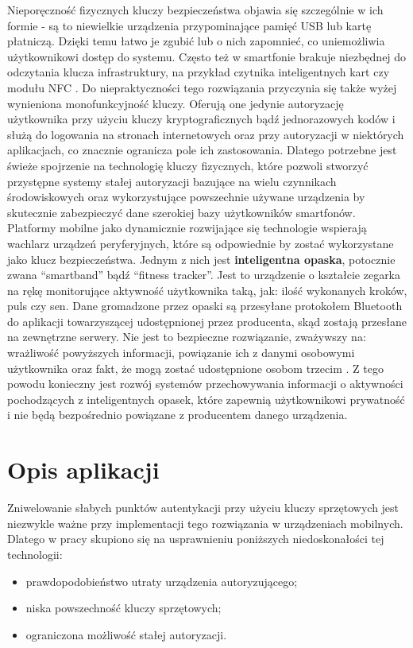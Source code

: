 \indent Nieporęczność fizycznych kluczy bezpieczeństwa objawia się szczególnie w ich formie - są to niewielkie urządzenia przypominające pamięć USB
lub kartę płatniczą. Dzięki temu łatwo je zgubić lub o nich zapomnieć, co uniemożliwia użytkownikowi dostęp do systemu. Często też w smartfonie
brakuje niezbędnej do odczytania klucza infrastruktury, na przykład czytnika inteligentnych kart czy modułu NFC \cite{Usability-Two-Factor}.
Do niepraktyczności tego rozwiązania przyczynia się także wyżej wynieniona monofunkcyjność kluczy. Oferują one jedynie autoryzację użytkownika przy
użyciu kluczy kryptograficznych bądź jednorazowych kodów i służą do logowania na stronach internetowych oraz przy autoryzacji w niektórych aplikacjach,
co znacznie ogranicza pole ich zastosowania. Dlatego potrzebne jest świeże spojrzenie na technologię kluczy fizycznych, które pozwoli stworzyć
przystępne systemy stałej autoryzacji bazujące na wielu czynnikach środowiskowych oraz wykorzystujące powszechnie używane urządzenia
by skutecznie zabezpieczyć dane szerokiej bazy użytkowników smartfonów.
\newline\newline
\indent Platformy mobilne jako dynamicznie rozwijające się technologie wspierają wachlarz urządzeń peryferyjnych, które są odpowiednie by zostać wykorzystane jako klucz bezpieczeństwa. Jednym z nich jest \textbf{inteligentna opaska}, potocznie zwana ``smartband'' bądź ``fitness tracker''. Jest to urządzenie o
kształcie zegarka na rękę monitorujące aktywność użytkownika taką, jak: ilość wykonanych kroków, puls czy sen. Dane gromadzone przez opaski są
przesyłane protokołem Bluetooth do aplikacji towarzyszącej udostępnionej przez producenta, skąd zostają przesłane na zewnętrzne serwery. Nie
jest to bezpieczne rozwiązanie, zważywszy na: wrażliwość powyższych informacji, powiązanie ich z danymi osobowymi użytkownika oraz fakt,
że mogą zostać udostępnione osobom trzecim \cite{Fitness-Tracker-Security}. Z tego powodu konieczny jest rozwój systemów przechowywania informacji o aktywności pochodzących z
inteligentnych opasek, które zapewnią użytkownikowi prywatność i nie będą bezpośrednio powiązane z producentem danego urządzenia.

\section{Opis aplikacji}
Zniwelowanie słabych punktów autentykacji przy użyciu kluczy sprzętowych jest niezwykle ważne przy implementacji tego rozwiązania w urządzeniach
mobilnych. Dlatego w pracy skupiono się na usprawnieniu poniższych niedoskonałości tej technologii:
\begin{itemize}
    \item prawdopodobieństwo utraty urządzenia autoryzującego;
    \item niska powszechność kluczy sprzętowych;
    \item ograniczona możliwość stałej autoryzacji.
\end{itemize}

